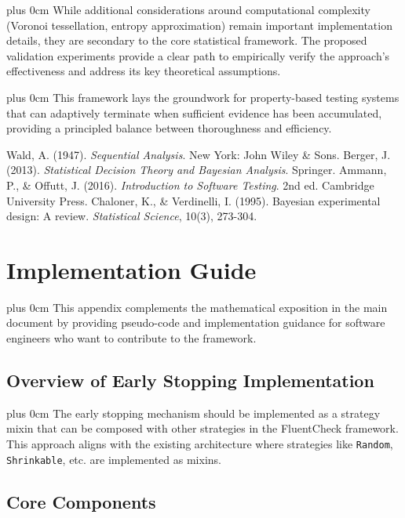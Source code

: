 \documentclass[11pt,a4paper]{article}
\newcommand{\justifytext}{\leftskip=0pt \rightskip=0pt plus 0cm}
\begin{document}
\justifytext
While additional considerations around computational complexity (Voronoi tessellation, entropy approximation) remain important implementation details, they are secondary to the core statistical framework. The proposed validation experiments provide a clear path to empirically verify the approach's effectiveness and address its key theoretical assumptions.

\justifytext
This framework lays the groundwork for property-based testing systems that can adaptively terminate when sufficient evidence has been accumulated, providing a principled balance between thoroughness and efficiency.

\begin{thebibliography}{99}
 Wald, A. (1947). \textit{Sequential Analysis}. New York: John Wiley \& Sons.
 Berger, J. (2013). \textit{Statistical Decision Theory and Bayesian Analysis}. Springer.
 Ammann, P., \& Offutt, J. (2016). \textit{Introduction to Software Testing}. 2nd ed. Cambridge University Press.
 Chaloner, K., \& Verdinelli, I. (1995). Bayesian experimental design: A review. \textit{Statistical Science}, 10(3), 273-304.
\end{thebibliography}

\appendix
\section{Implementation Guide}
\label{sec:implementation-guide}

\justifytext
This appendix complements the mathematical exposition in the main document by providing pseudo-code and implementation guidance for software engineers who want to contribute to the framework.

\subsection{Overview of Early Stopping Implementation}

\justifytext
The early stopping mechanism should be implemented as a strategy mixin that can be composed with other strategies in the FluentCheck framework. This approach aligns with the existing architecture where strategies like \texttt{Random}, \texttt{Shrinkable}, etc. are implemented as mixins.

\subsection{Core Components}
\end{document}
